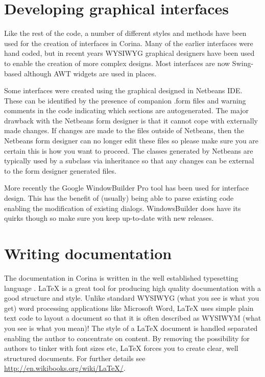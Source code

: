 \section{Developing graphical interfaces}
Like the rest of the code, a number of different styles and methods have been used for the creation of interfaces in Corina.  Many of the earlier interfaces were hand coded, but in recent years WYSIWYG graphical designers have been used to enable the creation of more complex designs.  Most interfaces are now Swing-based although AWT widgets are used in places.

Some interfaces were created using the graphical designed in Netbeans IDE.  These can be identified by the presence of companion .form files and warning comments in the code indicating which sections are autogenerated.  The major drawback with the Netbeans form designer is that it cannot cope with externally made changes.   If changes are made to the files outside of Netbeans, then the Netbeans form designer can no longer edit these files so please make sure you are certain this is how you want to proceed.  The classes generated by Netbeans are typically used by a subclass via inheritance so that any changes can be external to the form designer generated files. 

More recently the Google WindowBuilder Pro tool has been used for interface design.  This has the benefit of (usually) being able to parse existing code enabling the modification of existing dialogs.  WindowsBuilder does have its quirks though so make sure you keep up-to-date with new releases.

\section{Writing documentation}
The documentation in Corina is written in the well established typesetting language {\LaTeXe}.  {\LaTeX} is a great tool for producing high quality documentation with a good structure and style.  Unlike standard WYSIWYG (what you see is what you get) word processing applications like Microsoft Word, {\LaTeX} uses simple plain text code to layout a document so that it is often described as WYSIWYM (what you see is what you mean)!  The style of a {\LaTeX} document is handled separated enabling the author to concentrate on content.  By removing the possibility for authors to tinker with font sizes etc, {\LaTeX} forces you to create clear, well structured documents.  For further details see \url{http://en.wikibooks.org/wiki/LaTeX/}.

